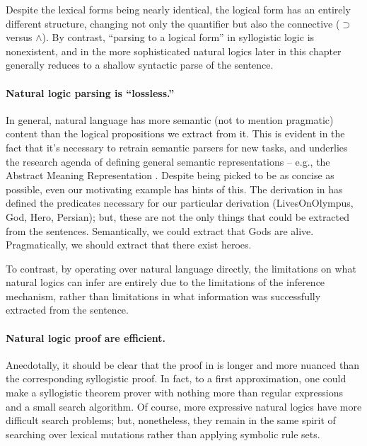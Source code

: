 Despite the lexical forms being nearly identical, the logical form has an entirely different
  structure, changing not only the quantifier but also the connective ($\supset$ versus $\land$).
By contrast, ``parsing to a logical form'' in syllogistic logic is nonexistent, and
  in the more sophisticated natural logics later in this chapter generally reduces to a
  shallow syntactic parse of the sentence.

\paragraph{Natural logic parsing is ``lossless.''}
In general, natural language has more semantic (not to mention pragmatic)
  content than the logical propositions we extract from it.
This is evident in the fact that it's necessary to retrain semantic parsers for new tasks, and underlies
  the research agenda of defining general semantic representations -- e.g., the Abstract Meaning
  Representation \cite{key:2013banarescu-amr}.
Despite being picked to be as concise as possible, even our motivating example
  has hints of this.
The derivation in  has defined the predicates necessary
  for our particular derivation (LivesOnOlympus, God, Hero, Persian); but, these are not
  the only things that could be extracted from the sentences.
Semantically, we could extract that Gods are alive.
Pragmatically, we should extract that there exist heroes.

To contrast, by operating over natural language directly, the limitations on what
  natural logics can infer are entirely due to the limitations of the inference
  mechanism, rather than limitations in what information was successfully extracted
  from the sentence.

\paragraph{Natural logic proof are efficient.}
Anecdotally, it should be clear that the proof in  is
  longer and more nuanced than the corresponding syllogistic proof.
In fact, to a first approximation, one could make a syllogistic theorem prover with
  nothing more than regular expressions and a small search algorithm.
Of course, more expressive natural logics have more difficult search problems;
  but, nonetheless, they remain in the same spirit of searching over lexical mutations
  rather than applying symbolic rule sets.

